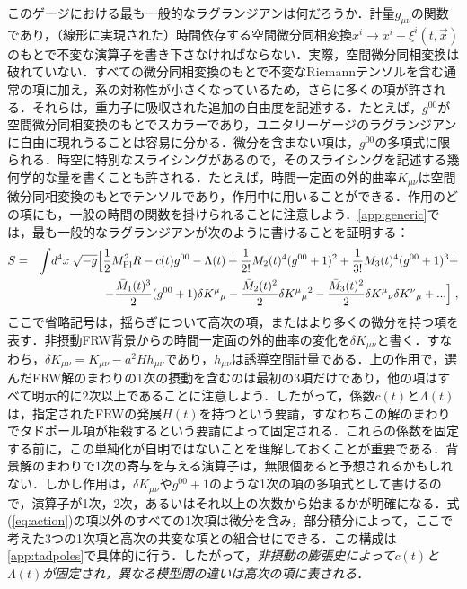 このゲージにおける最も一般的なラグランジアンは何だろうか．計量$g_{\mu\nu}$の関数であり，（線形に実現された）時間依存する空間微分同相変換$x^i\rightarrow x^i+\xi^i(t,\vec{x})$のもとで不変な演算子を書き下さなければならない．実際，空間微分同相変換は破れていない．すべての微分同相変換のもとで不変なRiemannテンソルを含む通常の項に加え，系の対称性が小さくなっているため，さらに多くの項が許される．それらは，重力子に吸収された追加の自由度を記述する．たとえば，$g^{00}$が空間微分同相変換のもとでスカラーであり，ユニタリーゲージのラグランジアンに自由に現れうることは容易に分かる．微分を含まない項は，$g^{00}$の多項式に限られる．時空に特別なスライシングがあるので，そのスライシングを記述する幾何学的な量を書くことも許される．たとえば，時間一定面の外的曲率$K_{\mu\nu}$は空間微分同相変換のもとでテンソルであり，作用中に用いることができる．作用のどの項にも，一般の時間の関数を掛けられることに注意しよう．\ref{app:generic}では，最も一般的なラグランジアンが次のように書けることを証明する：
\begin{eqnarray}
\label{eq:action}\nonumber
S & = & \int  \! d^4 x \; \sqrt{- g} \Big[ \frac12 M_{\rm Pl}^2 R - c(t)
g^{00} -  \Lambda(t) + \frac{1}{2!}M_2(t)^4(g^{00}+1)^2+\frac{1}{3!}M_3(t)^4 (g^{00}+1)^3+ \\
&& - \frac{\bar M_1(t)^3}{2} (g^{00}+1)\delta K^\mu {}_\mu
-\frac{\bar M_2(t)^2}{2} \delta K^\mu {}_\mu {}^2
-\frac{\bar M_3(t)^2}{2} \delta K^\mu {}_\nu \delta K^\nu {}_\mu + ...
\Big] \; ,
\end{eqnarray}
ここで省略記号は，揺らぎについて高次の項，またはより多くの微分を持つ項を表す．非摂動FRW背景からの時間一定面の外的曲率の変化を$\delta K_{\mu\nu}$と書く．すなわち，$\delta K_{\mu\nu} = K_{\mu\nu} - a^2 H h_{\mu\nu}$であり，$h_{\mu\nu}$は誘導空間計量である．上の作用で，選んだFRW解のまわりの1次の摂動を含むのは最初の3項だけであり，他の項はすべて明示的に2次以上であることに注意しよう．したがって，係数$c(t)$と$\Lambda(t)$は，指定されたFRWの発展$H(t)$を持つという要請，すなわちこの解のまわりでタドポール項が相殺するという要請によって固定される．これらの係数を固定する前に，この単純化が自明ではないことを理解しておくことが重要である．背景解のまわりで1次の寄与を与える演算子は，無限個あると予想されるかもしれない．しかし作用は，$\delta K_{\mu\nu}$や$g^{00}+1$のような1次の項の多項式として書けるので，演算子が1次，2次，あるいはそれ以上の次数から始まるかが明確になる．式(\ref{eq:action})の項以外のすべての1次項は微分を含み，部分積分によって，ここで考えた3つの1次項と高次の共変な項との組合せにできる．この構成は\ref{app:tadpoles}で具体的に行う．したがって，\emph{非摂動の膨張史によって$c(t)$と$\Lambda(t)$が固定され，異なる模型間の違いは高次の項に表される}．

